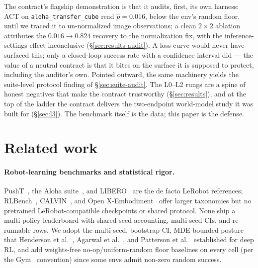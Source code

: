 \documentclass[10pt]{article}
\begin{document}
The contract's flagship demonstration is that it audits, first, its own
harness: ACT on
\texttt{aloha\_transfer\_cube} read $\hat{p}{=}0.016$, below the env's
random floor, until we traced it to un-normalized image observations; a
clean $2{\times}2$ ablation attributes the $0.016\to0.824$ recovery to the
normalization fix, with the inference-settings effect inconclusive
(\S\ref{sec:results-audit}). A loss curve would never have surfaced this;
only a closed-loop success rate with a confidence interval did --- the
value of a neutral contract is
that it bites on the surface it is supposed to protect, including the
auditor's own. Pointed outward, the same machinery yields the
suite-level protocol finding of \S\ref{sec:suite-audit}. The L0--L2 rungs
are a spine of honest negatives that make the contract trustworthy
(\S\ref{sec:results}), and at the top of the ladder the contract
delivers the two-endpoint world-model study it was built for
(\S\ref{sec:l3}). The benchmark
itself is the data; this paper is the defense.


\section{Related work}
\label{sec:related}

\paragraph{Robot-learning benchmarks and statistical rigor.}
PushT~\cite{chi2023diffusion}, the Aloha suite~\cite{zhao2023learning},
and LIBERO~\cite{liu2023libero} are the de facto LeRobot references;
RLBench~\cite{james2020rlbench}, CALVIN~\cite{mees2022calvin}, and Open
X-Embodiment~\cite{bohg2024open} offer larger taxonomies but no
pretrained LeRobot-compatible checkpoints or shared protocol. None ship a
multi-policy leaderboard with shared seed accounting, multi-seed CIs, and
re-runnable rows. We adopt the multi-seed, bootstrap-CI, MDE-bounded
posture that Henderson et al.~\cite{henderson2018deep}, Agarwal et
al.~\cite{agarwal2021deep}, and Patterson et
al.~\cite{patterson2024empirical} established for deep RL, and add
weights-free
no-op/uniform-random floor baselines on every cell (per the
Gym~\cite{brockman2016openai} convention) since some envs admit non-zero
random success.
\end{document}
